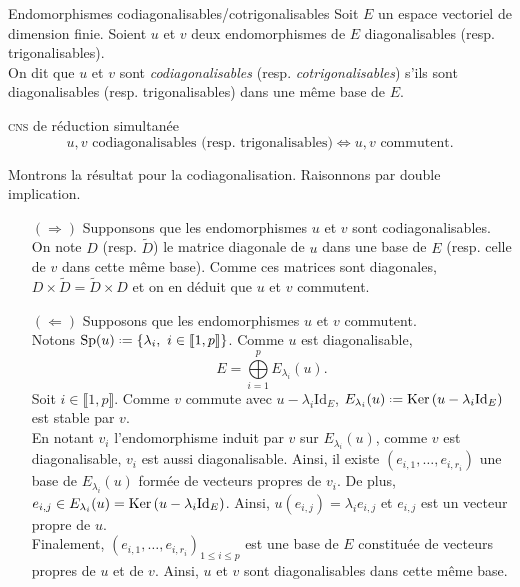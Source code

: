 \begin{defi}{Endomorphismes codiagonalisables/cotrigonalisables}
    Soit $E$ un espace vectoriel de dimension finie. Soient $u$ et $v$ deux endomorphismes de $E$ diagonalisables (resp. trigonalisables). \\
    On dit que $u$ et $v$ sont \emph{codiagonalisables} (resp. \emph{cotrigonalisables}) s'ils sont diagonalisables (resp. trigonalisables) dans une même base de $E$.
\end{defi}

\begin{prop}{\textsc{cns} de réduction simultanée}
    $$u, v \text{ codiagonalisables (resp. trigonalisables)} \Longleftrightarrow u, v \text{ commutent}.$$
\end{prop}

\begin{preuve} 
    Montrons la résultat pour la codiagonalisation. Raisonnons par double implication.
    \begin{itemize}
        \item[$(\Rightarrow)$] Supponsons que les endomorphismes $u$ et $v$ sont codiagonalisables. On note $D$ (resp. $\widetilde{D}$) le matrice diagonale de $u$ dans une base de $E$ (resp. celle de $v$ dans cette même base). Comme ces matrices sont diagonales, $D \times \widetilde{D} = \widetilde{D} \times D$ \note {} et on en déduit que $u$ et $v$ commutent.
        \item[$(\Leftarrow)$] Supposons que les endomorphismes $u$ et $v$ commutent. \\ 
        Notons $\mathrm{Sp}(u) \defeq \{ \lambda_i,\ i \in \llbracket1, p \rrbracket \}$. Comme $u$ est diagonalisable, 
        $$E = \bigoplus\limits_{i = 1}^{p} E_{\lambda_i}(u).$$
        Soit $i \in \llbracket 1, p \rrbracket$. Comme $v$ commute avec $u - \lambda_i \mathrm{Id}_E$, $E_{\lambda_i}(u) \defeq \Ker(u - \lambda_i \Id_E)$ est stable par $v$. \\
        En notant $v_i$ l'endomorphisme induit par $v$ sur $E_{\lambda_i}(u)$, comme $v$ est diagonalisable, $v_i$ est aussi diagonalisable. Ainsi, il existe $(e_{i, 1}, \dots, e_{i, r_i})$ une base de $E_{\lambda_i}(u)$ formée de vecteurs propres de $v_i$. De plus, $e_{i, j} \in E_{\lambda_i}(u) = \mathrm{Ker}\,(u - \lambda_i \mathrm{Id}_E)$. Ainsi, $u(e_{i,j}) = \lambda_i e_{i,j}$ et $e_{i,j}$ est un vecteur propre de $u$. \\
        Finalement, $(e_{i, 1}, \dots, e_{i, r_i})_{1 \leqslant i \leqslant p}$ est une base de $E$ constituée de vecteurs propres de $u$ et de $v$. Ainsi, $u$ et $v$ sont diagonalisables dans cette même base. 
    \end{itemize}
\end{preuve}

